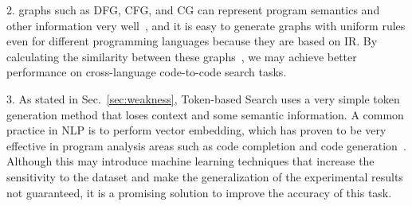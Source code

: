 \documentclass[conference]{IEEEtran}
\begin{document}
2. graphs such as DFG, CFG, and CG can represent program semantics and other information very well~\cite{CG-PY}, and it is easy to generate graphs with uniform rules even for different programming languages because they are based on IR. By calculating the similarity between these graphs~\cite{CFG-SIM, CG-SIM, GRAPH-SIM}, we may achieve better performance on cross-language code-to-code search tasks.

3. As stated in Sec.~\ref{sec:weakness}, Token-based Search uses a very simple token generation method that loses context and some semantic information. A common practice in NLP is to perform vector embedding, which has proven to be very effective in program analysis areas such as code completion and code generation~\cite{CODE-COMP}. Although this may introduce machine learning techniques that increase the sensitivity to the dataset and make the generalization of the experimental results not guaranteed, it is a promising solution to improve the accuracy of this task.



\end{document}
